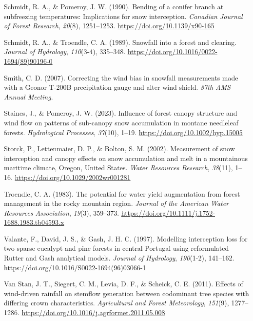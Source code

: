 \documentclass[
  letterpaper,
  DIV=11,
  numbers=noendperiod]{scrartcl}
\newlength{\cslhangindent}
\newenvironment{CSLReferences}[2] %
 {\begin{list}{}{%
  \setlength{\itemindent}{0pt}
  \setlength{\leftmargin}{0pt}
  \setlength{\parsep}{0pt}
  \ifodd #1
   \setlength{\leftmargin}{\cslhangindent}
   \setlength{\itemindent}{-1\cslhangindent}
  \fi
  \setlength{\itemsep}{#2\baselineskip}}}
 {\end{list}}
\begin{document}
\begin{CSLReferences}{1}{0}
Schmidt, R. A., \& Pomeroy, J. W. (1990). Bending of a conifer branch at
subfreezing temperatures: Implications for snow interception.
\emph{Canadian Journal of Forest Research}, \emph{20}(8), 1251--1253.
\url{https://doi.org/10.1139/x90-165}

Schmidt, R. A., \& Troendle, C. A. (1989). Snowfall into a forest and
clearing. \emph{Journal of Hydrology}, \emph{110}(3-4), 335--348.
\url{https://doi.org/10.1016/0022-1694(89)90196-0}

Smith, C. D. (2007). Correcting the wind bias in snowfall measurements
made with a {Geonor T-200B} precipitation gauge and alter wind shield.
\emph{87th {AMS} Annual Meeting}.

Staines, J., \& Pomeroy, J. W. (2023). Influence of forest canopy
structure and wind flow on patterns of sub-canopy snow accumulation in
montane needleleaf forests. \emph{Hydrological Processes},
\emph{37}(10), 1--19. \url{https://doi.org/10.1002/hyp.15005}

Storck, P., Lettenmaier, D. P., \& Bolton, S. M. (2002). Measurement of
snow interception and canopy effects on snow accumulation and melt in a
mountainous maritime climate, {Oregon}, {United States}. \emph{Water
Resources Research}, \emph{38}(11), 1--16.
\url{https://doi.org/10.1029/2002wr001281}

Troendle, C. A. (1983). The potential for water yield augmentation from
forest management in the rocky mountain region. \emph{Journal of the
American Water Resources Association}, \emph{19}(3), 359--373.
\url{https://doi.org/10.1111/j.1752-1688.1983.tb04593.x}

Valante, F., David, J. S., \& Gash, J. H. C. (1997). Modelling
interception loss for two sparse eucalypt and pine forests in central
{Portugal} using reformulated {Rutter} and {Gash} analytical models.
\emph{Journal of Hydrology}, \emph{190}(1-2), 141--162.
\url{https://doi.org/10.1016/S0022-1694(96)03066-1}

Van Stan, J. T., Siegert, C. M., Levia, D. F., \& Scheick, C. E. (2011).
Effects of wind-driven rainfall on stemflow generation between
codominant tree species with differing crown characteristics.
\emph{Agricultural and Forest Meteorology}, \emph{151}(9), 1277--1286.
\url{https://doi.org/10.1016/j.agrformet.2011.05.008}


\end{CSLReferences}
\end{document}
